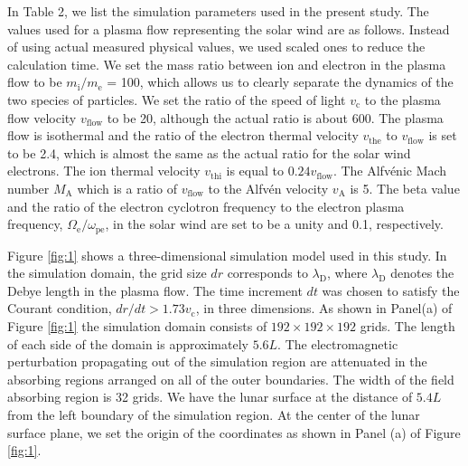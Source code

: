 \documentclass[draft,jgrga]{agutex2015}
\begin{document}
\begin{article}
In Table 2, 
we list the simulation parameters used in the present study. 
The values used for a plasma flow representing the solar wind are as follows. 
Instead of using actual measured physical values, 
we used scaled ones to reduce the calculation time. 
We set the mass ratio between ion and electron in the plasma flow 
to be $ m_\mathrm{i}/ m_\mathrm{e}$ = 100, which allows us 
to clearly separate the dynamics of the two species of particles. 
We set the ratio of the speed of light $v_\mathrm{c}$ to 
the plasma flow velocity $v_\mathrm{flow}$ to be 20, 
although the actual ratio is about 600. 
The plasma flow is isothermal and 
the ratio of the electron thermal velocity 
$v_\mathrm{the}$ to $v_\mathrm{flow}$ is set to be 2.4, 
which is almost the same as the actual ratio for the solar wind electrons. 
The ion thermal velocity $v_\mathrm{thi}$ is equal to $0.24v_\mathrm{flow}$.
The Alfv\'{e}nic Mach number $M_\mathrm{A}$ which is a ratio of $v_\mathrm{flow}$ to 
the Alfv\'{e}n velocity $v_\mathrm{A}$ is 5. 
The beta value and the ratio of 
the electron cyclotron frequency to
the electron plasma frequency,
$\Omega_\mathrm{e} / \omega_\mathrm{pe}$, 
in the solar wind are set to be a unity and 0.1, respectively. 

Figure \ref{fig:1} shows a three-dimensional simulation model used in this study.
In the simulation domain, 
the grid size $dr$ corresponds to $\lambda_\mathrm{D}$, 
where $\lambda_\mathrm{D}$ denotes the Debye length in the plasma flow.
The time increment $dt$ was chosen to satisfy 
the Courant condition, $dr/dt > 1.73 v_\mathrm{c}$, in three dimensions. 
As shown in Panel(a) of Figure \ref{fig:1} 
the simulation domain consists of $192 \times 192 \times 192$ grids. 
The length of each side of the domain is approximately $5.6L$. 
The electromagnetic perturbation propagating out of the simulation region
are attenuated in the absorbing regions arranged on all of the outer boundaries. 
The width of the field absorbing region is 32 grids.
We have the lunar surface at the distance of $5.4L$ 
from the left boundary of the simulation region.
At the center of the lunar surface plane, 
we set the origin of the coordinates 
as shown in Panel (a) of Figure \ref{fig:1}.


\end{article}
\end{document}
